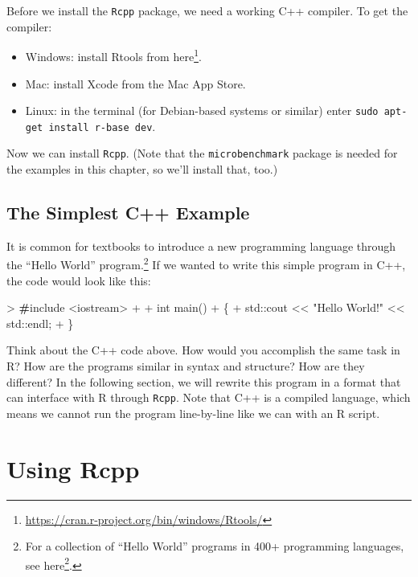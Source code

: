 \documentclass[]{krantz}
\makeatletter
\newenvironment{Shaded}{\begin{snugshade}}{\end{snugshade}}
\newcommand{\DataTypeTok}[1]{\textcolor[rgb]{0.27,0.27,0.27}{#1}}
\newcommand{\StringTok}[1]{\textcolor[rgb]{0.5,0.5,0.5}{#1}}
\newcommand{\BuiltInTok}[1]{#1}
\newcommand{\ErrorTok}[1]{\textcolor[rgb]{0.14,0.14,0.14}{\textbf{#1}}}
\newcommand{\NormalTok}[1]{#1}
\providecommand{\tightlist}{%
  \setlength{\itemsep}{0pt}\setlength{\parskip}{0pt}}
\renewcommand{\href}[2]{#2\footnote{\url{#1}}}
\newenvironment{kframe}{%
\medskip{}
\setlength{\fboxsep}{.8em}
 \def\at@end@of@kframe{}%
 \ifinner\ifhmode%
  \def\at@end@of@kframe{\end{minipage}}%
  \begin{minipage}{\columnwidth}%
 \fi\fi%
 \def\FrameCommand##1{\hskip\@totalleftmargin \hskip-\fboxsep
 \colorbox{shadecolor}{##1}\hskip-\fboxsep
     \hskip-\linewidth \hskip-\@totalleftmargin \hskip\columnwidth}%
 \MakeFramed {\advance\hsize-\width
   \@totalleftmargin\z@ \linewidth\hsize
   \@setminipage}}%
 {\par\unskip\endMakeFramed%
 \at@end@of@kframe}
\renewenvironment{Shaded}{\begin{kframe}}{\end{kframe}}
\makeatother
\begin{document}
Before we install the \texttt{Rcpp} package, we need a working C++
compiler. To get the compiler:

\begin{itemize}
\tightlist
\item
  Windows: install Rtools from
  \href{https://cran.r-project.org/bin/windows/Rtools/}{here}.
\item
  Mac: install Xcode from the Mac App Store.
\item
  Linux: in the terminal (for Debian-based systems or similar) enter
  \texttt{sudo\ apt-get\ install\ r-base\ dev}.
\end{itemize}

Now we can install \texttt{Rcpp}. (Note that the \texttt{microbenchmark}
package is needed for the examples in this chapter, so we'll install
that, too.)

\subsection{The Simplest C++ Example}\label{the-simplest-c-example}

It is common for textbooks to introduce a new programming language
through the ``Hello World'' program.\footnote{For a collection of
  ``Hello World'' programs in 400+ programming languages, see
  \href{https://helloworldcollection.github.io/}{here}.} If we wanted to
write this simple program in C++, the code would look like this:

\begin{Shaded}
\begin{Highlighting}[]
\NormalTok{> }\ErrorTok{#}\NormalTok{include <iostream>}
\NormalTok{+ }
\NormalTok{+ }\DataTypeTok{int}\NormalTok{ main()}
\NormalTok{+ \{}
\NormalTok{+     }\BuiltInTok{std::}\NormalTok{cout << }\StringTok{"Hello World!"}\NormalTok{ << }\BuiltInTok{std::}\NormalTok{endl;}
\NormalTok{+ \}}
\end{Highlighting}
\end{Shaded}

Think about the C++ code above. How would you accomplish the same task
in R? How are the programs similar in syntax and structure? How are they
different? In the following section, we will rewrite this program in a
format that can interface with R through \texttt{Rcpp}. Note that C++ is
a compiled language, which means we cannot run the program line-by-line
like we can with an R script.

\section{Using Rcpp}\label{using-rcpp}
\end{document}
